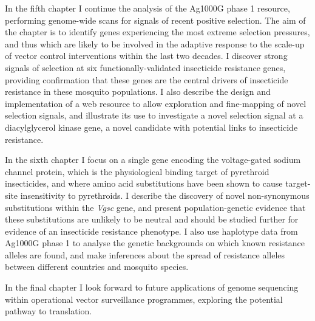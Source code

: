 \begin{refsection}
In the fifth chapter I continue the analysis of the Ag1000G phase 1 resource, performing genome-wide scans for signals of recent positive selection.
%
The aim of the chapter is to identify genes experiencing the most extreme selection pressures, and thus which are likely to be involved in the adaptive response to the scale-up of vector control interventions within the last two decades.
%
I discover strong signals of selection at six functionally-validated insecticide resistance genes, providing confirmation that these genes are the central drivers of insecticide resistance in these mosquito populations.
%
I also describe the design and implementation of a web resource to allow exploration and fine-mapping of novel selection signals, and illustrate its use to investigate a novel selection signal at a diacylglycerol kinase gene, a novel candidate with potential links to insecticide resistance.


In the sixth chapter I focus on a single gene encoding the voltage-gated sodium channel protein, which is the physiological binding target of pyrethroid insecticides, and where amino acid substitutions have been shown to cause target-site insensitivity to pyrethroids.
%
I describe the discovery of novel non-synonymous substitutions within the \textit{Vgsc} gene, and present population-genetic evidence that these substitutions are unlikely to be neutral and should be studied further for evidence of an insecticide resistance phenotype.
%
I also use haplotype data from Ag1000G phase 1 to analyse the genetic backgrounds on which known resistance alleles are found, and make inferences about the spread of resistance alleles between different countries and mosquito species.


In the final chapter I look forward to future applications of genome sequencing within operational vector surveillance programmes, exploring the potential pathway to translation. 


\printbibliography[
heading=subbibintoc,
title={References}
]

\end{refsection}
